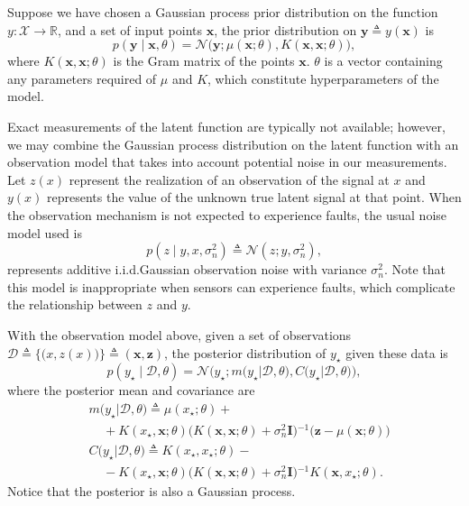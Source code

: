 \documentclass{article}
\newcommand{\R}{\ensuremath{\mathbb{R}}}
\newcommand{\deq}{\ensuremath{\triangleq}}
\newcommand{\given}{\ensuremath{\mid}}
\newcommand{\cm}[1]{\ensuremath{\mathcal{#1}}}
\newcommand{\bm}[1]{\ensuremath{\mathbf{#1}}}
\newcommand{\data}{\ensuremath{\cm{D}}}
\newcommand{\inv}{\ensuremath{^{-1}}}
\newcommand{\mean}[2]{{m}\bigl(#1\big\vert#2\bigr)}
\newcommand{\cov}[2]{{C}\bigl(#1\big\vert#2\bigr)}
\newcommand{\st}{_{\star}}
\begin{document}
Suppose we have chosen a Gaussian process prior distribution
on the function $y\colon \cm{X} \to \R$,
and a set
of input points $\bm{x}$, the prior distribution on $\bm{y} \deq y(\bm{x})$ is
\begin{equation*}
 p(\bm{y} \given \bm{x}, \theta)
 =
 \cm{N}
 \bigl(
   \bm{y};
   \mu(\bm{x}; \theta),
   K(\bm{x}, \bm{x}; \theta)
 \bigr),
\end{equation*}
where $K(\bm{x}, \bm{x}; \theta)$ is the Gram matrix of the points
$\bm{x}$. $\theta$ is a vector containing any parameters required of $\mu$
and $K$, which constitute hyperparameters of the model. 

Exact measurements of the latent function are typically not available;
however, we may combine the Gaussian process distribution on the
latent function with an observation model that takes into account
potential noise in our measurements. 
Let $z(x)$ represent the realization of an observation of the
signal at $x$ and $y(x)$ represents the value of the unknown true
latent signal at that point.
 When the observation mechanism
is not expected to experience faults, the usual noise model used is
\begin{equation}\label{iidnoise}
 p(z \given y, x, \sigma_n^2)
 \deq
 \cm{N}(z; y, \sigma_n^2),
\end{equation}
represents additive i.i.d.\space Gaussian observation noise with
variance $\sigma_n^2$. Note that this model is inappropriate when sensors
can experience faults, which complicate the relationship between $z$ and $y$.

With the observation model above, given a set of observations
$
 \data
 \deq
 \bigl\lbrace
   \bigl( x, z(x) \bigr)
  \bigr\rbrace
 \deq
 ( \bm{x}, \bm{z} )$,
the posterior distribution of $y\st$ given these data is
\begin{equation*}
 p(y\st \given \data, \theta)
 =
 \cm{N}
 \bigl(
   y\st;
   \mean{y\st}{\data,\theta},
   \cov{y\st}{\data,\theta}
 \bigr),
\end{equation*}
where the posterior mean and covariance are
\begin{align*}
 &
 \mean{y\st}{\data,\theta}
 \deq
 \mu(x\st; \theta)
 +
 {}
 \\
 &
 \mspace{20mu}
 +
 K(x\st, \bm{x}; \theta)
 \bigl(
 K(\bm{x}, \bm{x}; \theta) + \sigma_n^2 \bm{I}
 \bigr)\inv
 \bigl(
   \bm{z} - \mu(\bm{x}; \theta)
 \bigr)
 \\  
 &
 \cov{y\st}{\data,\theta}
 \deq
 K(x\st, x\st; \theta)
 -
 {}
 \\
 &
 \mspace{20mu}
 -
 K(x\st, \bm{x}; \theta)
 \bigl(
   K(\bm{x}, \bm{x}; \theta) + \sigma_n^2 \bm{I}
 \bigr)\inv
 K(\bm{x}, x\st; \theta).
\end{align*}
Notice that the posterior is also a Gaussian process. 
\end{document}
